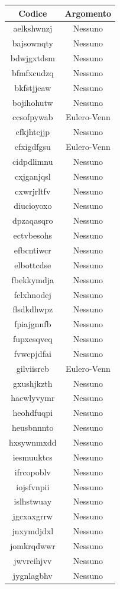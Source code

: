 \begin{longtable}{|c|c|}
	\hline
	\textbf{Codice} & \textbf{Argomento} \\\hline\hline

aelkshwnzj & Nessuno \\
bajsownqty & Nessuno \\
bdwjgxtdsm & Nessuno \\
bfmfxcudzq & Nessuno \\
bkfstjjeaw & Nessuno \\
bojihohutw & Nessuno \\
ccsofpywab & Eulero-Venn \\
cfkjhtcjjp & Nessuno \\
cfxigdfgsu & Eulero-Venn \\
cidpdlimnu & Nessuno \\
cxjganjqsl & Nessuno \\
cxwrjrltfv & Nessuno \\
diucioyoxo & Nessuno \\
dpzaqasqro & Nessuno \\
ectvbesohs & Nessuno \\
efbcntiwcr & Nessuno \\
elbottcdse & Nessuno \\
fbekkymdja & Nessuno \\
fclxhnodej & Nessuno \\
flsdkdhwpz & Nessuno \\
fpiajgnnfb & Nessuno \\
fupxesqveq & Nessuno \\
fvwcpjdfai & Nessuno \\
gilviisrcb & Eulero-Venn \\
gxushjkzth & Nessuno \\
hacwlyvymr & Nessuno \\
heohdfuqpi & Nessuno \\
heusbnnnto & Nessuno \\
hxsywnmxdd & Nessuno \\
iesmuuktcs & Nessuno \\
ifrcopoblv & Nessuno \\
iojsfvnpii & Nessuno \\
islhstwuay & Nessuno \\
jgcxaxgrrw & Nessuno \\
jnxymdjdxl & Nessuno \\
jomkrqdwwr & Nessuno \\
jwvreihjvv & Nessuno \\
jygnlagbhv & Nessuno \\

\end{longtable}
